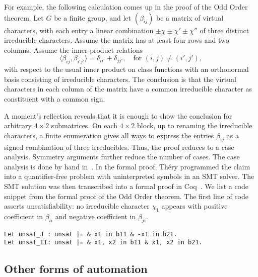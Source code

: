\documentclass[brochure,english,12pt]{bourbaki}
\theoremstyle{plain}
\begin{document}
For example, the following calculation comes up in the proof of the
Odd Order theorem.  Let $G$ be a finite group, and let $(\beta_{ij})$
be a matrix of virtual characters, with each entry a linear
combination $\pm \chi \pm \chi' \pm \chi''$ of three distinct irreducible
characters.  Assume the matrix has at least four rows and two columns.
Assume the inner product relations
\[
\langle \beta_{ij},\beta_{i'j'}\rangle = \delta_{ii'} + \delta_{jj'},\quad \text{for } (i,j)\ne (i',j'),
\]
with respect to the usual inner product on class functions with an orthonormal basis consisting
of irreducible characters.  
The conclusion is that  the virtual characters in each column of the matrix have a common irreducible character as constituent
with a common sign.

A moment's reflection reveals that it is enough to show the conclusion
for arbitrary $4\times 2$ submatrices.  On each $4\times 2$ block, up
to renaming the irreducible characters, a finite enumeration gives all
ways to express the entries $\beta_{ij}$ as a signed combination of
three irreducibles.  Thus, the proof reduces to a case analysis.
Symmetry arguments further reduce the number of cases.  The case
analysis is done by hand in~\cite{peterfalvi2000character}.  In the
formal proof, Th\'ery programmed the claim into a quantifier-free
problem with uninterpreted symbols in an SMT solver.  The SMT solution
was then transcribed into a formal proof in
Coq~\cite{gonthier2013machine}.  We list a code snippet from the
formal proof of the Odd Order theorem.  
The first line of code asserts unsatisfiability:  no irreducible character
$\chi_1$ appears with positive coefficient in $\beta_{ii}$ and
negative coefficient in $\beta_{ji}$.


\begin{lstlisting}[keepspaces=true,stringstyle=\tt,basicstyle=\small,frame=single,framesep=8pt,mathescape,morekeywords={Let},columns=flexible]
Let unsat_J : unsat |= & x1 in b11 & -x1 in b21.
Let unsat_II: unsat |= & x1, x2 in b11 & x1, x2 in b21.
\end{lstlisting}






\subsection{Other forms of automation}
\end{document}
